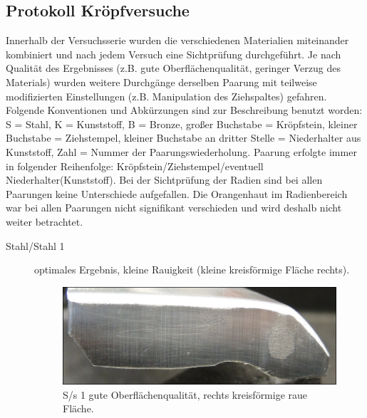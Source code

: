 \documentclass[12pt,a4paper,parskip,twoside,BCOR5mm,headsepline]{scrartcl}
\begin{document}
\begin{description*}
\subsection{Protokoll Kröpfversuche}
Innerhalb der Versuchsserie wurden die verschiedenen Materialien miteinander kombiniert und nach jedem Versuch eine Sichtprüfung durchgeführt. Je nach Qualität des Ergebnisses (z.B. gute Oberflächenqualität, geringer Verzug des Materials) wurden weitere Durchgänge derselben Paarung mit teilweise modifizierten Einstellungen (z.B. Manipulation des Ziehspaltes) gefahren. Folgende Konventionen und Abkürzungen sind zur Beschreibung benutzt worden: S = Stahl, K = Kunststoff, B = Bronze, großer Buchstabe = Kröpfstein, kleiner Buchstabe = Ziehstempel,  kleiner Buchstabe an dritter Stelle = Niederhalter aus Kunststoff, Zahl = Nummer der Paarungswiederholung. Paarung erfolgte immer in folgender Reihenfolge: Kröpfstein/Ziehstempel/eventuell Niederhalter(Kunststoff). Bei der Sichtprüfung der Radien sind bei allen Paarungen keine Unterschiede aufgefallen. Die Orangenhaut im Radienbereich war bei allen Paarungen nicht signifikant verschieden und wird deshalb nicht weiter betrachtet.

\begin{description}
\item[Stahl/Stahl 1] optimales Ergebnis, kleine Rauigkeit (kleine kreisförmige Fläche rechts).
\begin{figure}[H]
\centering
\includegraphics[width=.8\textwidth]{Ss1a}
\caption{S/s 1 gute Oberflächenqualität, rechts kreisförmige raue Fläche.}
\label{fig:ss1a}
\end{figure}


\end{description}
\end{description*}
\end{document}
